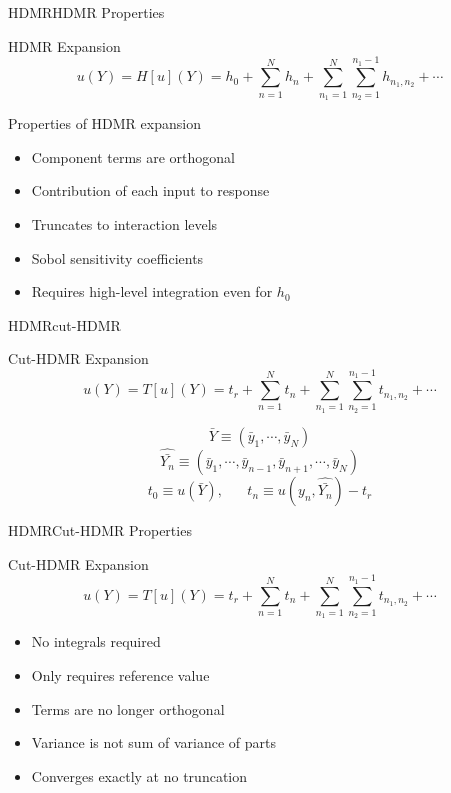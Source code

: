 \documentclass{beamer}
\begin{document}
\begin{frame}{HDMR}{HDMR Properties}%
  \begin{block}{HDMR Expansion}
    \[u(Y) = H[u](Y) = h_0 + \sum_{n=1}^N h_n + \sum_{n_1=1}^N\sum_{n_2=1}^{n_1-1} h_{n_1,n_2}+\cdots\]
  \end{block}
  Properties of HDMR expansion
  \begin{itemize}
    \item Component terms are orthogonal
    \item Contribution of each input to response
    \item Truncates to interaction levels
    \item Sobol sensitivity coefficients
    \item Requires high-level integration even for $h_0$
  \end{itemize}
  \vfill
\end{frame}

\begin{frame}{HDMR}{cut-HDMR}%
  \begin{block}{Cut-HDMR Expansion}
    \[u(Y) = T[u](Y) = t_r + \sum_{n=1}^N t_n + \sum_{n_1=1}^N\sum_{n_2=1}^{n_1-1} t_{n_1,n_2}+\cdots\]
  \end{block}
  \[\bar Y \equiv (\bar y_1,\cdots,\bar y_N)\]
  \vfill
  \[\hat{\bar{ Y_n}} \equiv (\bar y_1,\cdots,\bar y_{n-1},\bar y_{n+1},\cdots,\bar y_N)\]
  \vfill
  \[t_0 \equiv u(\bar Y), \hspace{20pt} t_n \equiv u(y_n,\hat{\bar{Y_n}}) - t_r\]
  \vfill
\end{frame}

\begin{frame}{HDMR}{Cut-HDMR Properties}%
  \begin{block}{Cut-HDMR Expansion}
    \[u(Y) = T[u](Y) = t_r + \sum_{n=1}^N t_n + \sum_{n_1=1}^N\sum_{n_2=1}^{n_1-1} t_{n_1,n_2}+\cdots\]
  \end{block}
  \begin{itemize}
    \item No integrals required
    \item Only requires reference value
    \item Terms are no longer orthogonal
    \item Variance is not sum of variance of parts
    \item Converges exactly at no truncation
  \end{itemize}
\end{frame}
\end{document}
